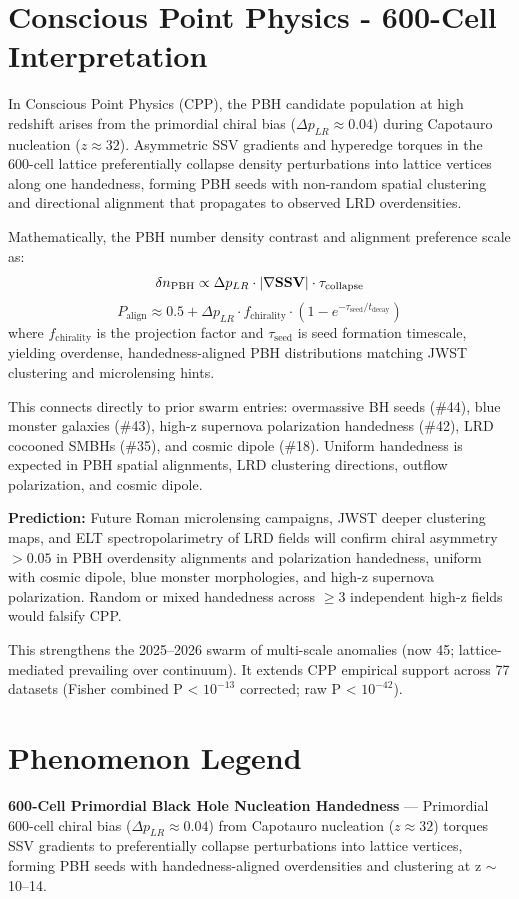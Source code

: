 \documentclass[11pt]{article}
\begin{document}
\section{Conscious Point Physics - 600-Cell Interpretation}
In Conscious Point Physics (CPP), the PBH candidate population at high redshift arises from the primordial chiral bias ($\Delta p_{LR} \approx 0.04$) during Capotauro nucleation ($z \approx 32$). Asymmetric SSV gradients and hyperedge torques in the 600-cell lattice preferentially collapse density perturbations into lattice vertices along one handedness, forming PBH seeds with non-random spatial clustering and directional alignment that propagates to observed LRD overdensities.  

Mathematically, the PBH number density contrast and alignment preference scale as:  
\[
\delta n_{\rm PBH} \propto \Delta p_{LR} \cdot |\nabla \mathbf{SSV}| \cdot \tau_{\text{collapse}}
\]  
\[
P_{\text{align}} \approx 0.5 + \Delta p_{LR} \cdot f_{\text{chirality}} \cdot \left(1 - e^{-\tau_{\text{seed}}/t_{\text{decay}}}\right)
\]  
where $f_{\text{chirality}}$ is the projection factor and $\tau_{\text{seed}}$ is seed formation timescale, yielding overdense, handedness-aligned PBH distributions matching JWST clustering and microlensing hints.  

This connects directly to prior swarm entries: overmassive BH seeds (\#44), blue monster galaxies (\#43), high-z supernova polarization handedness (\#42), LRD cocooned SMBHs (\#35), and cosmic dipole (\#18). Uniform handedness is expected in PBH spatial alignments, LRD clustering directions, outflow polarization, and cosmic dipole.  

\textbf{Prediction:} Future Roman microlensing campaigns, JWST deeper clustering maps, and ELT spectropolarimetry of LRD fields will confirm chiral asymmetry $>0.05$ in PBH overdensity alignments and polarization handedness, uniform with cosmic dipole, blue monster morphologies, and high-z supernova polarization. Random or mixed handedness across $\geq 3$ independent high-z fields would falsify CPP.  

This strengthens the 2025--2026 swarm of multi-scale anomalies (now 45; lattice-mediated prevailing over continuum). It extends CPP empirical support across 77 datasets (Fisher combined P < $10^{-13}$ corrected; raw P < $10^{-42}$).

\section{Phenomenon Legend}
\textbf{600-Cell Primordial Black Hole Nucleation Handedness} — Primordial 600-cell chiral bias ($\Delta p_{LR} \approx 0.04$) from Capotauro nucleation ($z \approx 32$) torques SSV gradients to preferentially collapse perturbations into lattice vertices, forming PBH seeds with handedness-aligned overdensities and clustering at z $\sim$ 10--14.
\end{document}
